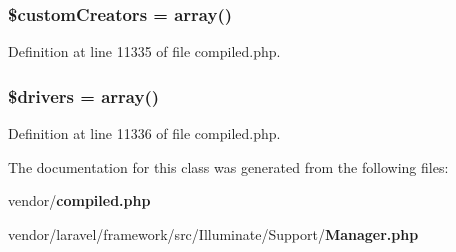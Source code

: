 \subsubsection[{\$custom\+Creators}]{\setlength{\rightskip}{0pt plus 5cm}\$custom\+Creators = array()\hspace{0.3cm}{\ttfamily [protected]}}\label{class_illuminate_1_1_support_1_1_manager_a86b1d4bc8526082278943d9d3a461016}


Definition at line 11335 of file compiled.\+php.

\subsubsection[{\$drivers}]{\setlength{\rightskip}{0pt plus 5cm}\$drivers = array()\hspace{0.3cm}{\ttfamily [protected]}}\label{class_illuminate_1_1_support_1_1_manager_a5a3fe066d8a5e6244a4bc55d0223c53c}


Definition at line 11336 of file compiled.\+php.



The documentation for this class was generated from the following files\+:\begin{DoxyCompactItemize}
\item 
vendor/{\bf compiled.\+php}\item 
vendor/laravel/framework/src/\+Illuminate/\+Support/{\bf Manager.\+php}\end{DoxyCompactItemize}
